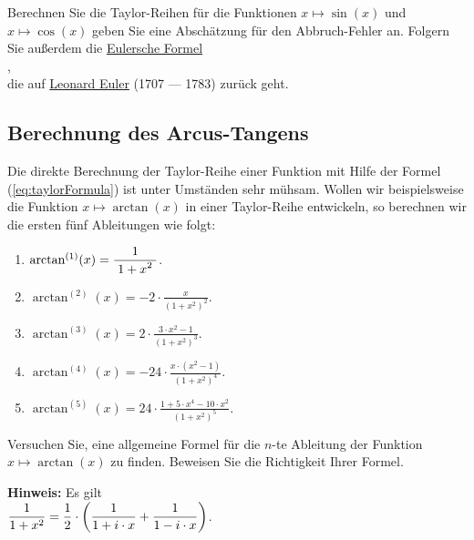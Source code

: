 \exercise
 Berechnen Sie die Taylor-Reihen f\"ur die Funktionen $x \mapsto \sin(x)$ und $x \mapsto \cos(x)$ geben Sie eine
Absch\"atzung f\"ur den Abbruch-Fehler an.  Folgern Sie au{\ss}erdem die
\href{http://de.wikipedia.org/wiki/Eulersche_Formel}{Eulersche Formel}
\\[0.2cm]
\hspace*{1.3cm}
\colorbox{orange}{},
\\[0.2cm]
die auf 
\href{http://en.wikipedia.org/wiki/Leonard_Euler}{Leonard Euler} (1707 --- 1783) zur\"uck geht.
\eox


\subsection{Berechnung des Arcus-Tangens}
Die direkte Berechnung der Taylor-Reihe einer Funktion mit Hilfe der Formel
(\ref{eq:taylorFormula}) ist unter Umst\"anden sehr m\"uhsam.  Wollen wir beispielsweise die
Funktion $x \mapsto \arctan(x)$ in einer Taylor-Reihe entwickeln, so berechnen wir die
ersten f\"unf Ableitungen wie folgt:
\begin{enumerate}
\item $\arctan^{(1)}(x) = \displaystyle\frac{\;\displaystyle1\;}{\;\displaystyle1+{x}^{2}\;}$.
\item $\arctan^{(2)}(x) = \displaystyle -2 \cdot {\frac {x}{ \left( 1+{x}^{2} \right) ^{2}}}$.
\item $\arctan^{(3)}(x) = \displaystyle 2\cdot {\frac {3\cdot{x}^{2}-1}{ \left( 1+{x}^{2} \right)^{3}}}$.
\item $\arctan^{(4)}(x) = \displaystyle -24\cdot{\frac {x\cdot \left({x}^{2} - 1\right) }{ \left( 1+{x}^{2}
      \right)^{4}}}$.
\item $\arctan^{(5)}(x) = \displaystyle 24 \cdot{\frac {1+5\cdot{x}^{4}-10\cdot{x}^{2}}{ \left( 1+{x}^{2} \right)^{5}}}$.
\end{enumerate}

\exercise
Versuchen Sie, eine allgemeine Formel f\"ur die $n$-te Ableitung der Funktion \\
$x \mapsto \arctan(x)$ 
zu finden.  Beweisen Sie die Richtigkeit Ihrer Formel. 
\vspace*{0.2cm}

\noindent
\textbf{Hinweis:}  Es gilt
\\[0.2cm]
\hspace*{1.3cm}
$\displaystyle\frac{1}{1 + x^2} = \frac{1}{2} \cdot \left(\frac{1}{1 + i \cdot x} + \frac{1}{1 - i \cdot x}\right)$.
\eox
\vspace*{0.2cm}

